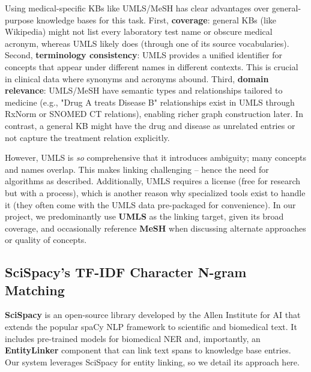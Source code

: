 Using medical-specific KBs like UMLS/MeSH has clear advantages over general-purpose knowledge bases for this task. First, \textbf{coverage}: general KBs (like Wikipedia) might not list every laboratory test name or obscure medical acronym, whereas UMLS likely does (through one of its source vocabularies). Second, \textbf{terminology consistency}: UMLS provides a unified identifier for concepts that appear under different names in different contexts. This is crucial in clinical data where synonyms and acronyms abound. Third, \textbf{domain relevance}: UMLS/MeSH have semantic types and relationships tailored to medicine (e.g., "Drug A treats Disease B" relationships exist in UMLS through RxNorm or SNOMED CT relations), enabling richer graph construction later. In contrast, a general KB might have the drug and disease as unrelated entries or not capture the treatment relation explicitly.

However, UMLS is \emph{so} comprehensive that it introduces ambiguity; many concepts and names overlap. This makes linking challenging – hence the need for algorithms as described. Additionally, UMLS requires a license (free for research but with a process), which is another reason why specialized tools exist to handle it (they often come with the UMLS data pre-packaged for convenience). In our project, we predominantly use \textbf{UMLS} as the linking target, given its broad coverage, and occasionally reference \textbf{MeSH} when discussing alternate approaches or quality of concepts.

\subsection{SciSpacy's TF-IDF Character N-gram Matching}

\textbf{SciSpacy} \cite{Neumann2019} is an open-source library developed by the Allen Institute for AI that extends the popular spaCy NLP framework to scientific and biomedical text. It includes pre-trained models for biomedical NER and, importantly, an \textbf{EntityLinker} component that can link text spans to knowledge base entries. Our system leverages SciSpacy for entity linking, so we detail its approach here.


